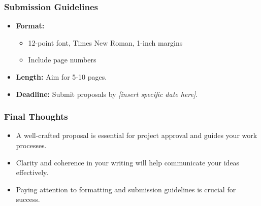 \documentclass[aspectratio=169]{beamer}
\begin{document}
\begin{frame}[fragile]
    \frametitle{Submission Guidelines}
    \begin{itemize}
        \item \textbf{Format:} 
        \begin{itemize}
            \item 12-point font, Times New Roman, 1-inch margins
            \item Include page numbers
        \end{itemize}
        \item \textbf{Length:} Aim for 5-10 pages.
        \item \textbf{Deadline:} Submit proposals by \textit{[insert specific date here]}.
    \end{itemize}
\end{frame}

\begin{frame}[fragile]
    \frametitle{Final Thoughts}
    \begin{itemize}
        \item A well-crafted proposal is essential for project approval and guides your work processes.
        \item Clarity and coherence in your writing will help communicate your ideas effectively.
        \item Paying attention to formatting and submission guidelines is crucial for success.
    \end{itemize}
\end{frame}
\end{document}
